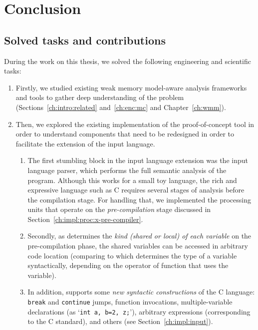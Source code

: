 \chapter{Conclusion}
\label{ch:summary}


\section{Solved tasks and contributions}

During the work on this thesis, we solved the following engineering and scientific tasks:

\begin{enumerate}[label=\Roman*.]
\item
Firstly, we studied existing weak memory model-aware analysis frameworks and tools to gather deep understanding of the problem (Sections~\ref{ch:intro:related} and~\ref{ch:enc:mc} and Chapter~\ref{ch:wmm}).

\item
Then, we explored the existing implementation of the proof-of-concept tool \porthos[1] in order to understand components that need to be redesigned in order to facilitate the extension of the input language.

  \begin{enumerate}[label=\roman*.,leftmargin=\parindent]
  \item The first stumbling block in the input language extension was the \porthos[1] input language parser, which performs the full semantic analysis of the program.
  Although this works for a small toy language, the rich and expressive language such as C requires several stages of analysis before the compilation stage.
  For handling that, we implemented the processing units that operate on the \textit{pre-compilation} stage discussed in Section~\ref{ch:impl:proc:x-pre-compiler}.
  
  \item Secondly, as \porthos[2] determines the \textit{kind (shared or local) of each variable} on the pre-compilation phase, the shared variables can be accessed in arbitrary code location (comparing to \porthos[1] which determines the type of a variable syntactically, depending on the operator of function that uses the variable).
  
  \item In addition, \porthos[2] supports some \textit{new syntactic constructions} of the C language: \texttt{break} and \texttt{continue} jumps, function invocations, multiple-variable declarations (as `\texttt{int a, b=2, z;}'), arbitrary expressions (corresponding to the C standard), and others (see Section~\ref{ch:impl:input}).


\end{enumerate}
\end{enumerate}
